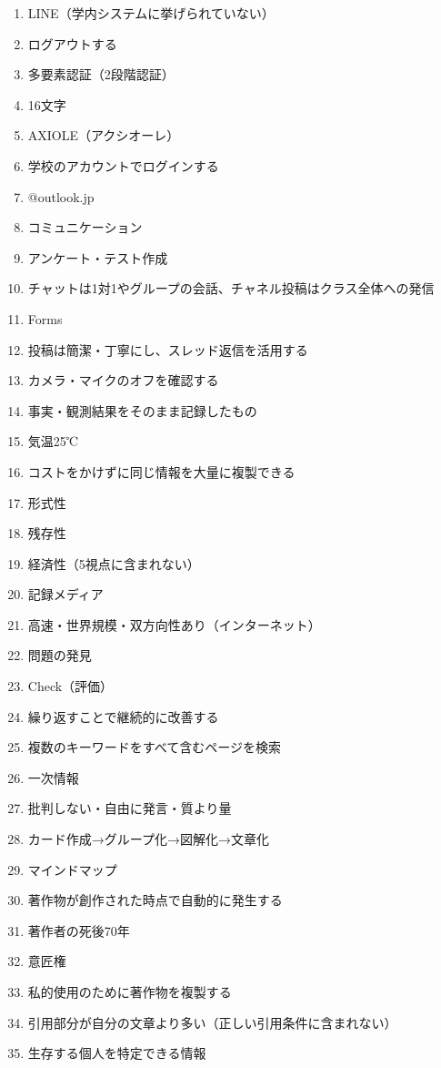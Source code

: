 \documentclass[b4paper,7pt,twocolumn,landscape]{jsarticle}
\begin{document}
{\small
\begin{enumerate}
  \item LINE（学内システムに挙げられていない）
  \item ログアウトする
  \item 多要素認証（2段階認証）
  \item 16文字
  \item AXIOLE（アクシオーレ）
  \item 学校のアカウントでログインする
  \item @outlook.jp
  \item コミュニケーション
  \item アンケート・テスト作成
  \item チャットは1対1やグループの会話、チャネル投稿はクラス全体への発信
  \item Forms
  \item 投稿は簡潔・丁寧にし、スレッド返信を活用する
  \item カメラ・マイクのオフを確認する
  \item 事実・観測結果をそのまま記録したもの
  \item 気温25℃
  \item コストをかけずに同じ情報を大量に複製できる
  \item 形式性
  \item 残存性
  \item 経済性（5視点に含まれない）
  \item 記録メディア
  \item 高速・世界規模・双方向性あり（インターネット）
  \item 問題の発見
  \item Check（評価）
  \item 繰り返すことで継続的に改善する
  \item 複数のキーワードをすべて含むページを検索
  \item 一次情報
  \item 批判しない・自由に発言・質より量
  \item カード作成→グループ化→図解化→文章化
  \item マインドマップ
  \item 著作物が創作された時点で自動的に発生する
  \item 著作者の死後70年
  \item 意匠権
  \item 私的使用のために著作物を複製する
  \item 引用部分が自分の文章より多い（正しい引用条件に含まれない）
  \item 生存する個人を特定できる情報

\end{enumerate}}
\end{document}
